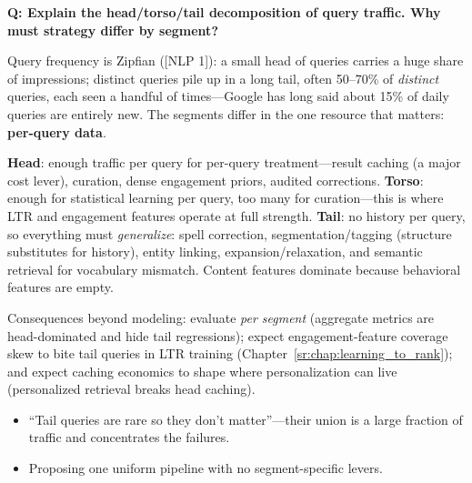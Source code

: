 \begin{interviewq}
\textbf{Q: Explain the head/torso/tail decomposition of query traffic. Why must strategy differ by segment?}

 \quad {} \quad \badgefreq{\freqmed}

\stronganswer

Query frequency is Zipfian ([NLP 1]): a small head of queries carries a huge share of impressions; distinct queries pile up in a long tail, often 50--70\% of \textit{distinct} queries, each seen a handful of times---Google has long said about 15\% of daily queries are entirely new. The segments differ in the one resource that matters: \textbf{per-query data}.

\textbf{Head}: enough traffic per query for per-query treatment---result caching (a major cost lever), curation, dense engagement priors, audited corrections. \textbf{Torso}: enough for statistical learning per query, too many for curation---this is where LTR and engagement features operate at full strength. \textbf{Tail}: no history per query, so everything must \textit{generalize}: spell correction, segmentation/tagging (structure substitutes for history), entity linking, expansion/relaxation, and semantic retrieval for vocabulary mismatch. Content features dominate because behavioral features are empty.

Consequences beyond modeling: evaluate \textit{per segment} (aggregate metrics are head-dominated and hide tail regressions); expect engagement-feature coverage skew to bite tail queries in LTR training (Chapter~\ref{sr:chap:learning_to_rank}); and expect caching economics to shape where personalization can live (personalized retrieval breaks head caching).

\redflags
\begin{itemize}
    \item ``Tail queries are rare so they don't matter''---their union is a large fraction of traffic and concentrates the failures.
    \item Proposing one uniform pipeline with no segment-specific levers.
\end{itemize}


\end{interviewq}

